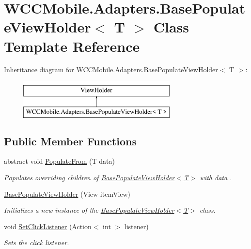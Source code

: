 \hypertarget{class_w_c_c_mobile_1_1_adapters_1_1_base_populate_view_holder}{}\section{W\+C\+C\+Mobile.\+Adapters.\+Base\+Populate\+View\+Holder$<$ T $>$ Class Template Reference}
\label{class_w_c_c_mobile_1_1_adapters_1_1_base_populate_view_holder}
Inheritance diagram for W\+C\+C\+Mobile.\+Adapters.\+Base\+Populate\+View\+Holder$<$ T $>$\+:\begin{figure}[H]
\begin{center}
\leavevmode
\includegraphics[height=2.000000cm]{class_w_c_c_mobile_1_1_adapters_1_1_base_populate_view_holder}
\end{center}
\end{figure}
\subsection*{Public Member Functions}
\begin{DoxyCompactItemize}
\item 
abstract void \hyperlink{class_w_c_c_mobile_1_1_adapters_1_1_base_populate_view_holder_aa4fb01d73390980ec2d122ddc4d1739c}{Populate\+From} (T data)
\begin{DoxyCompactList}\small\item\em Populates overriding children of \hyperlink{class_w_c_c_mobile_1_1_adapters_1_1_base_populate_view_holder_a633bdb266d578bee85e40840b2905593}{Base\+Populate\+View\+Holder$<$\+T$>$} with {\itshape data} . \end{DoxyCompactList}\item 
\hyperlink{class_w_c_c_mobile_1_1_adapters_1_1_base_populate_view_holder_a633bdb266d578bee85e40840b2905593}{Base\+Populate\+View\+Holder} (View item\+View)
\begin{DoxyCompactList}\small\item\em Initializes a new instance of the \hyperlink{class_w_c_c_mobile_1_1_adapters_1_1_base_populate_view_holder_a633bdb266d578bee85e40840b2905593}{Base\+Populate\+View\+Holder$<$\+T$>$} class. \end{DoxyCompactList}\item 
void \hyperlink{class_w_c_c_mobile_1_1_adapters_1_1_base_populate_view_holder_a31e7627fe3cc68311934b017305f4eb9}{Set\+Click\+Listener} (Action$<$ int $>$ listener)
\begin{DoxyCompactList}\small\item\em Sets the click listener. \end{DoxyCompactList}\end{DoxyCompactItemize}
